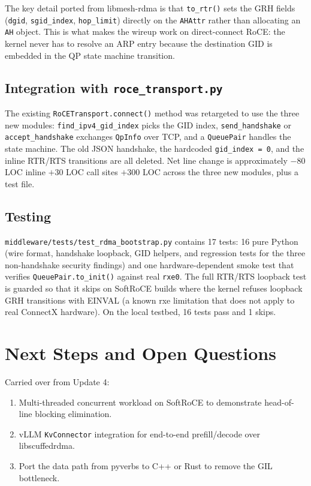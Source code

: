 \documentclass[11pt]{article}
\begin{document}
The key detail ported from libmesh-rdma is that \texttt{to\_rtr()} sets
the GRH fields (\texttt{dgid}, \texttt{sgid\_index}, \texttt{hop\_limit})
directly on the \texttt{AHAttr} rather than allocating an
\texttt{AH} object. This is what makes the wireup work on direct-connect
RoCE: the kernel never has to resolve an ARP entry because the
destination GID is embedded in the QP state machine transition.

\subsection{Integration with \texttt{roce\_transport.py}}

The existing \texttt{RoCETransport.connect()} method was retargeted to
use the three new modules: \texttt{find\_ipv4\_gid\_index} picks the
GID index, \texttt{send\_handshake} or \texttt{accept\_handshake}
exchanges \texttt{QpInfo} over TCP, and a \texttt{QueuePair} handles
the state machine. The old JSON handshake, the hardcoded
\texttt{gid\_index = 0}, and the inline RTR/RTS transitions are all
deleted. Net line change is approximately $-80$ LOC inline
$+30$ LOC call sites $+300$ LOC across the three new modules, plus a
test file.

\subsection{Testing}

\texttt{middleware/tests/test\_rdma\_bootstrap.py} contains 17 tests:
16 pure Python (wire format, handshake loopback, GID helpers, and
regression tests for the three non-handshake security findings) and
one hardware-dependent smoke test that verifies \texttt{QueuePair.to\_init()}
against real \texttt{rxe0}. The full RTR/RTS loopback test is guarded
so that it skips on SoftRoCE builds where the kernel refuses loopback
GRH transitions with EINVAL (a known rxe limitation that does not
apply to real ConnectX hardware). On the local testbed, 16 tests pass
and 1 skips.

\section{Next Steps and Open Questions}
\label{sec:next_steps}

Carried over from Update 4:

\begin{enumerate}
  \item Multi-threaded concurrent workload on SoftRoCE to demonstrate
        head-of-line blocking elimination.
  \item vLLM \texttt{KvConnector} integration for end-to-end
        prefill/decode over libscuffedrdma.
  \item Port the data path from pyverbs to C++ or Rust to remove the
        GIL bottleneck.
\end{enumerate}
\end{document}
